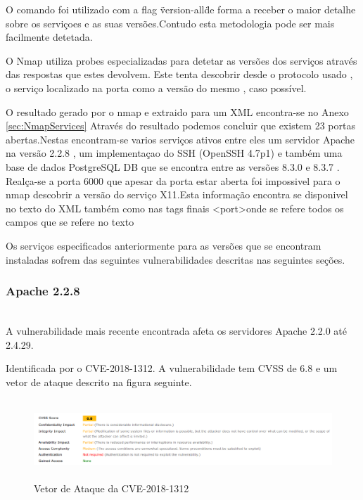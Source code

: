 O comando foi utilizado com a flag \"version-all\" de forma a receber o maior detalhe sobre os serviçoes e as suas versões.Contudo esta metodologia pode ser mais facilmente detetada.

O Nmap utiliza probes especializadas para detetar as versões dos serviços através das respostas que estes devolvem. Este tenta descobrir desde o protocolo usado , o serviço localizado na porta como a versão do mesmo , caso possível.

O resultado gerado por o nmap e extraido para um XML encontra-se no Anexo \ref{sec:NmapServices}
Através do resultado podemos concluir que existem 23 portas abertas.Nestas encontram-se varios serviços ativos entre eles um servidor Apache na versão 2.2.8 , um implementaçao do SSH (OpenSSH 4.7p1) e também uma base de dados PostgreSQL DB que se encontra entre as versões 8.3.0 e 8.3.7 . Realça-se a porta 6000 que apesar da porta estar aberta foi impossivel para o nmap descobrir a versão do serviço X11.Esta informação encontra se disponivel no texto do XML também como nas tags finais \textless port\textgreater onde se refere todos os campos que se refere no texto

Os serviços especificados anteriormente para as versões que se encontram instaladas sofrem das seguintes vulnerabilidades descritas nas seguintes seções.

\subsubsection{Apache 2.2.8}
\hfill\\

A vulnerabilidade mais recente encontrada afeta os servidores Apache 2.2.0 até 2.4.29.

Identificada por o CVE-2018-1312. A vulnerabilidade tem CVSS de 6.8 e um vetor de ataque descrito na figura seguinte.

\begin{figure}[h!]
	\centering
		
	\includegraphics[width=\textwidth,height=3cm,keepaspectratio]{images/apacheCVE.png}
		
	\caption{Vetor de Ataque da CVE-2018-1312}
		
	\label{fig:apacheCVE}
\end{figure}


